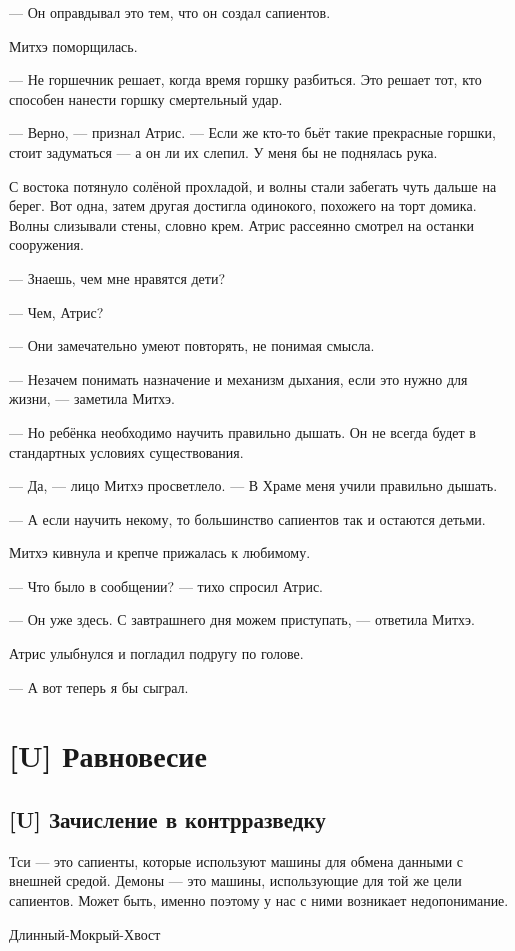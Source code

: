 --- Он оправдывал это тем, что он создал сапиентов.

Митхэ поморщилась.

--- Не горшечник решает, когда время горшку разбиться.
Это решает тот, кто способен нанести горшку смертельный удар.

--- Верно, --- признал Атрис.
--- Если же кто-то бьёт такие прекрасные горшки, стоит задуматься --- а он ли их слепил.
У меня бы не поднялась рука.

С востока потянуло солёной прохладой, и волны стали забегать чуть дальше на берег.
Вот одна, затем другая достигла одинокого, похожего на торт домика.
Волны слизывали стены, словно крем.
Атрис рассеянно смотрел на останки сооружения.

--- Знаешь, чем мне нравятся дети?

--- Чем, Атрис?

--- Они замечательно умеют повторять, не понимая смысла.

--- Незачем понимать назначение и механизм дыхания, если это нужно для жизни, --- заметила Митхэ.

--- Но ребёнка необходимо научить правильно дышать.
Он не всегда будет в стандартных условиях существования.

--- Да, --- лицо Митхэ просветлело.
--- В Храме меня учили правильно дышать.

--- А если научить некому, то большинство сапиентов так и остаются детьми.

Митхэ кивнула и крепче прижалась к любимому.

--- Что было в сообщении? --- тихо спросил Атрис.

--- Он уже здесь.
С завтрашнего дня можем приступать, --- ответила Митхэ.

Атрис улыбнулся и погладил подругу по голове.

--- А вот теперь я бы сыграл.

\chapter{[U] Равновесие}

\section{[U] Зачисление в контрразведку}

\epigraph
{Тси --- это сапиенты, которые используют машины для обмена данными с внешней средой.
Демоны --- это машины, использующие для той же цели сапиентов.
Может быть, именно поэтому у нас с ними возникает недопонимание.}
{Длинный-Мокрый-Хвост}

